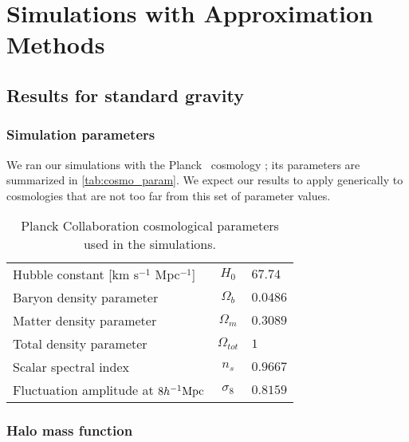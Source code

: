 \chapter{Simulations with Approximation Methods}

\section{Results for standard gravity}

\subsection{Simulation parameters}
We ran our simulations with the Planck \LCDM\ cosmology \parencite{planck_cosm}; its parameters are summarized in \autoref{tab:cosmo_param}. We expect our results to apply generically to cosmologies that are not too far from this set of parameter values.

\begin{table}
\begin{tabular}{ l c l }
  \hline \hline
  Hubble constant  [km s$^{-1}$ Mpc$^{-1}$] & $H_0$ & $67.74$ \\
  Baryon density parameter & $\Omega_b$ & $0.0486$ \\
  Matter density parameter & $\Omega_m$ & $0.3089$ \\
  Total density parameter & $\Omega_{tot}$ & $1$ \\
  Scalar spectral index & $n_s$ & $0.9667$ \\
  Fluctuation amplitude at $8h^{-1}\text{Mpc}$ & $\sigma_8$ & $0.8159$ \\
  \hline \hline
\end{tabular}
\caption{Planck Collaboration cosmological parameters \parencite{planck_cosm} used in the simulations.}
\label{tab:cosmo_param}
\end{table}









\subsection{Halo mass function}

